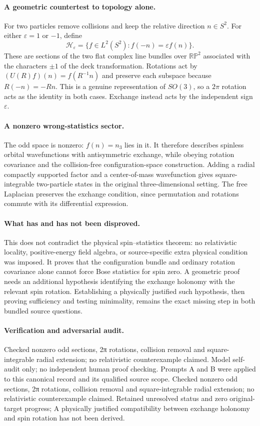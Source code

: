 \documentclass[11pt]{article}
\begin{document}
\paragraph{A geometric countertest to topology alone.} For two particles remove collisions and keep the relative direction $n\in S^2$. For either $\varepsilon=1$ or $-1$, define
\[
 \mathcal H_\varepsilon=\{f\in L^2(S^2):f(-n)=\varepsilon f(n)\}.
\]
These are sections of the two flat complex line bundles over $\mathbb{RP}^2$ associated with the characters $\pm1$ of the deck transformation. Rotations act by $(U(R)f)(n)=f(R^{-1}n)$ and preserve each subspace because $R(-n)=-Rn$. This is a genuine representation of $SO(3)$, so a $2\pi$ rotation acts as the identity in both cases. Exchange instead acts by the independent sign $\varepsilon$.

\paragraph{A nonzero wrong-statistics sector.} The odd space is nonzero: $f(n)=n_3$ lies in it. It therefore describes spinless orbital wavefunctions with antisymmetric exchange, while obeying rotation covariance and the collision-free configuration-space construction. Adding a radial compactly supported factor and a center-of-mass wavefunction gives square-integrable two-particle states in the original three-dimensional setting. The free Laplacian preserves the exchange condition, since permutation and rotations commute with its differential expression.

\paragraph{What has and has not been disproved.} This does not contradict the physical spin--statistics theorem: no relativistic locality, positive-energy field algebra, or source-specific extra physical condition was imposed. It proves that the configuration bundle and ordinary rotation covariance alone cannot force Bose statistics for spin zero. A geometric proof needs an additional hypothesis identifying the exchange holonomy with the relevant spin rotation. Establishing a physically justified such hypothesis, then proving sufficiency and testing minimality, remains the exact missing step in both bundled source questions.

\paragraph{Verification and adversarial audit.}
Checked nonzero odd sections, 2π rotations, collision removal and square-integrable radial extension; no relativistic counterexample claimed. Model self-audit only; no independent human proof checking. Prompts A and B were applied to this canonical record and its qualified source scope. Checked nonzero odd sections, 2π rotations, collision removal and square-integrable radial extension; no relativistic counterexample claimed. Retained unresolved status and zero original-target progress; A physically justified compatibility between exchange holonomy and spin rotation has not been derived.
\end{document}
